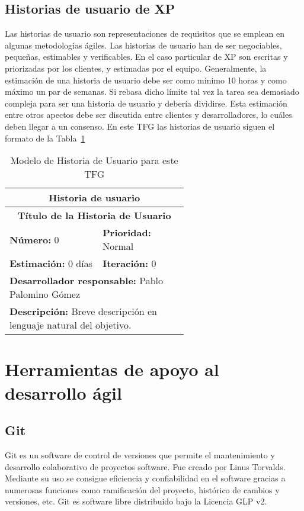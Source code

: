\subsection{Historias de usuario de XP}
Las historias de usuario son representaciones de requisitos que se emplean en algunas metodologías ágiles. Las historias de usuario han de ser negociables, pequeñas, estimables y verificables. En el caso particular de \gls{XP} son escritas y priorizadas por los clientes, y estimadas por el equipo. Generalmente, la estimación de una historia de usuario debe ser como mínimo 10 horas y como máximo un par de semanas. Si rebasa dicho límite tal vez la tarea sea demasiado compleja para ser una historia de usuario y debería dividirse. Esta estimación entre otros apectos debe ser discutida entre clientes y desarrolladores, lo cuáles deben llegar a un consenso. En este \gls{TFG} las historias de usuario siguen el formato de la Tabla~\ref{tab:histModel}
\begin{table}[H]
        \centering
        \begin{tabular}{|p{0.3\linewidth}|p{0.3\linewidth}|}
          \hline
          \multicolumn{2}{|c|}{Historia de usuario}\\ \hline
          \multicolumn{2}{|c|}{\textbf{Título de la Historia de Usuario}}\\ \hline
          \textbf{Número:} 0  & \textbf{Prioridad:} Normal  \\ \hline
          \textbf{Estimación:} 0 días  & \textbf{Iteración:} 0 \\ \hline
          \multicolumn{2}{|l|}{\textbf{Desarrollador responsable:} Pablo Palomino Gómez}\\ \hline
          \multicolumn{2}{|p{0.6\linewidth}|}{\textbf{Descripción:} Breve descripción en lenguaje natural del objetivo.}\\ \hline
        \end{tabular}
        \caption{Modelo de Historia de Usuario para este TFG}
        \label{tab:histModel}
\end{table}

\section{Herramientas de apoyo al desarrollo ágil}
\subsection{Git}
Git es un software de control de versiones que permite el mantenimiento y desarrollo colaborativo de proyectos software. Fue creado por Linus Torvalds. Mediante su uso se consigue eficiencia y confiabilidad en el software gracias a numerosas funciones como ramificación del proyecto, histórico de cambios y versiones, etc. Git es software libre distribuido bajo la Licencia \gls{GLP} v2.

